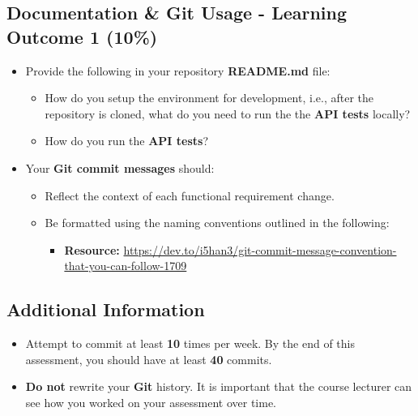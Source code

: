 \documentclass{article}
\begin{document}
\subsection*{Documentation \& Git Usage - Learning Outcome 1 (10\%)}
\begin{itemize}
    \item Provide the following in your repository \textbf{README.md} file:
          \begin{itemize}
            \item How do you setup the environment for development, i.e., after the repository is cloned, what do you need to run the the \textbf{API tests} locally?
            \item How do you run the \textbf{API tests}?
          \end{itemize}
\end{itemize}
\begin{itemize}
    \item Your \textbf{Git commit messages} should:
          \begin{itemize}
            \item Reflect the context of each functional requirement change. 
            \item Be formatted using the naming conventions outlined in the following:
                  \begin{itemize}
                    \item \textbf{Resource:} \small\href{https://dev.to/i5han3/git-commit-message-convention-that-you-can-follow-1709}{https://dev.to/i5han3/git-commit-message-convention-that-you-can-follow-1709}
                  \end{itemize} 
          \end{itemize}
\end{itemize}
          
\subsection*{Additional Information}
\begin{itemize}
    \item Attempt to commit at least \textbf{10} times per week. By the end of this assessment, you should have at least \textbf{40} commits.
    \item \textbf{Do not} rewrite your \textbf{Git} history. It is important that the course lecturer can see how you worked on your assessment over time. 
\end{itemize} 
\end{document}
